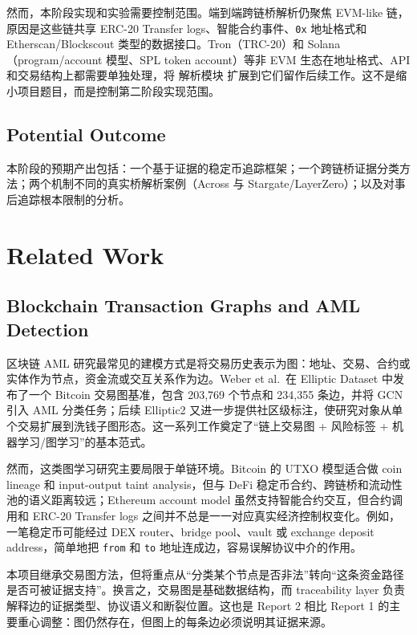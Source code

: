 \documentclass[12pt,a4paper]{ctexart}
\begin{document}
然而，本阶段实现和实验需要控制范围。端到端跨链桥解析仍聚焦 EVM-like
链，原因是这些链共享 ERC-20 Transfer logs、智能合约事件、\texttt{0x}
地址格式和 Etherscan/Blockscout 类型的数据接口。Tron（TRC-20）和
Solana（program/account 模型、SPL token account）等非 EVM
生态在地址格式、API 和交易结构上都需要单独处理，将 解析模块
扩展到它们留作后续工作。这不是缩小项目题目，而是控制第二阶段实现范围。

\hypertarget{potential-outcome}{%
\subsection{Potential Outcome}\label{potential-outcome}}

本阶段的预期产出包括：一个基于证据的稳定币追踪框架；一个跨链桥证据分类方法；两个机制不同的真实桥解析案例（Across 与
Stargate/LayerZero）；以及对事后追踪根本限制的分析。

\hypertarget{related-work}{%
\section{Related Work}\label{related-work}}

\hypertarget{blockchain-transaction-graphs-and-aml-detection}{%
\subsection{Blockchain Transaction Graphs and AML
Detection}\label{blockchain-transaction-graphs-and-aml-detection}}

区块链 AML
研究最常见的建模方式是将交易历史表示为图：地址、交易、合约或实体作为节点，资金流或交互关系作为边。Weber
et al.~在 Elliptic Dataset 中发布了一个 Bitcoin 交易图基准，包含 203,769
个节点和 234,355 条边，并将 GCN 引入 AML 分类任务；后续 Elliptic2
又进一步提供社区级标注，使研究对象从单个交易扩展到洗钱子图形态。这一系列工作奠定了``链上交易图
+ 风险标签 + 机器学习/图学习''的基本范式。

然而，这类图学习研究主要局限于单链环境。Bitcoin 的 UTXO 模型适合做 coin
lineage 和 input-output taint analysis，但与 DeFi
稳定币合约、跨链桥和流动性池的语义距离较远；Ethereum account model
虽然支持智能合约交互，但合约调用和 ERC-20 Transfer logs
之间并不总是一一对应真实经济控制权变化。例如，一笔稳定币可能经过 DEX
router、bridge pool、vault 或 exchange deposit address，简单地把
\texttt{from} 和 \texttt{to} 地址连成边，容易误解协议中介的作用。

本项目继承交易图方法，但将重点从``分类某个节点是否非法''转向``这条资金路径是否可被证据支持''。换言之，交易图是基础数据结构，而
traceability layer 负责解释边的证据类型、协议语义和断裂位置。这也是
Report 2 相比 Report 1
的主要重心调整：图仍然存在，但图上的每条边必须说明其证据来源。
\end{document}
